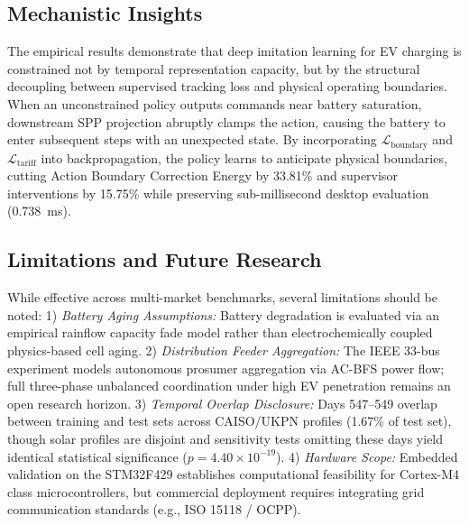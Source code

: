 \documentclass[journal]{IEEEtran}
\theoremstyle{remark}
\begin{document}
\subsection{Mechanistic Insights}
The empirical results demonstrate that deep imitation learning for EV charging is constrained not by temporal representation capacity, but by the structural decoupling between supervised tracking loss and physical operating boundaries. When an unconstrained policy outputs commands near battery saturation, downstream SPP projection abruptly clamps the action, causing the battery to enter subsequent steps with an unexpected state. By incorporating $\mathcal{L}_{\mathrm{boundary}}$ and $\mathcal{L}_{\mathrm{tariff}}$ into backpropagation, the policy learns to anticipate physical boundaries, cutting Action Boundary Correction Energy by 33.81\% and supervisor interventions by 15.75\% while preserving sub-millisecond desktop evaluation (0.738~ms).

\subsection{Limitations and Future Research}
While effective across multi-market benchmarks, several limitations should be noted:
1) \textit{Battery Aging Assumptions:} Battery degradation is evaluated via an empirical rainflow capacity fade model rather than electrochemically coupled physics-based cell aging.
2) \textit{Distribution Feeder Aggregation:} The IEEE 33-bus experiment models autonomous prosumer aggregation via AC-BFS power flow; full three-phase unbalanced coordination under high EV penetration remains an open research horizon.
3) \textit{Temporal Overlap Disclosure:} Days 547--549 overlap between training and test sets across CAISO/UKPN profiles (1.67\% of test set), though solar profiles are disjoint and sensitivity tests omitting these days yield identical statistical significance ($p = 4.40 \times 10^{-19}$).
4) \textit{Hardware Scope:} Embedded validation on the STM32F429 establishes computational feasibility for Cortex-M4 class microcontrollers, but commercial deployment requires integrating grid communication standards (e.g., ISO 15118 / OCPP).
\end{document}
